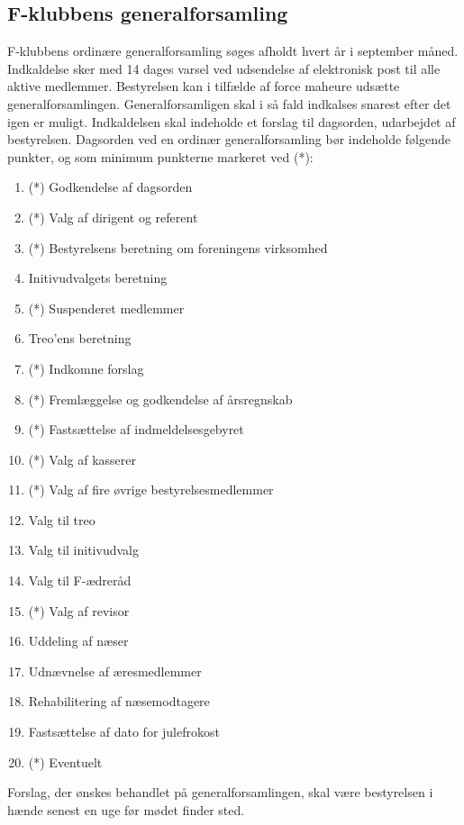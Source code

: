 \documentclass[a4paper,12pt,danish]{article}
\begin{document}
\begin{list}
\section{F-klubbens generalforsamling}

\item \label{par-gen} F-klubbens ordinære generalforsamling
  søges afholdt hvert år i september måned. Indkaldelse sker med 14
  dages varsel ved udsendelse af elektronisk post til alle aktive
  medlemmer. Bestyrelsen kan i tilfælde af force maheure udsætte 
  generalforsamlingen. Generalforsamligen skal i så fald indkalses 
  snarest efter det igen er muligt. Indkaldelsen skal indeholde et forslag til
  dagsorden, udarbejdet af bestyrelsen. Dagsorden ved en ordinær
  generalforsamling bør indeholde følgende punkter, og som minimum
punkterne markeret ved (*):

\begin{enumerate}
\item (*) Godkendelse af dagsorden
\item (*) Valg af dirigent og referent
\item (*) Bestyrelsens beretning om foreningens virksomhed
\item Initivudvalgets beretning
\item (*) Suspenderet medlemmer
\item Treo'ens beretning
\item (*) Indkomne forslag
\item (*) Fremlæggelse og godkendelse af årsregnskab
\item (*) Fastsættelse af indmeldelsesgebyret
\item (*) Valg af kasserer
\item (*) Valg af fire øvrige bestyrelsesmedlemmer
\item Valg til treo
\item Valg til initivudvalg
\item Valg til F-ædreråd
\item (*) Valg af revisor
\item Uddeling af næser
\item Udnævnelse af æresmedlemmer
\item Rehabilitering af næsemodtagere
\item Fastsættelse af dato for julefrokost
\item (*) Eventuelt
\end{enumerate}

Forslag, der ønskes behandlet på generalforsamlingen, skal
være bestyrelsen i hænde senest en uge før mødet finder
  sted.
  

\end{list}
\end{document}
